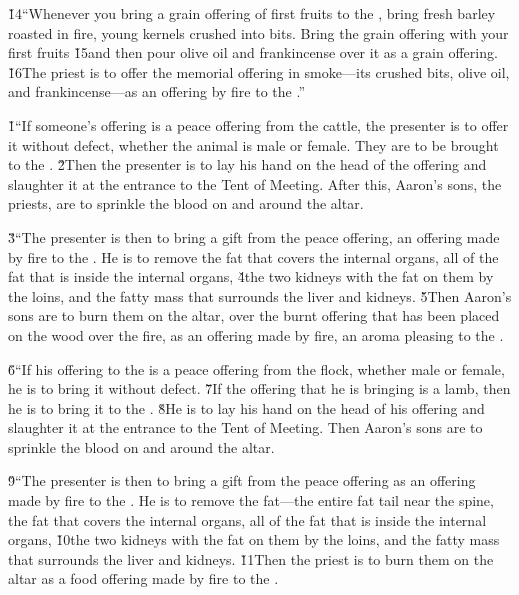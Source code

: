 \v{14}``Whenever you bring a grain offering of first fruits to the , bring fresh barley roasted in fire, young kernels crushed into bits. Bring the grain offering with your first fruits \v{15}and then pour olive oil and frankincense over it as a grain offering. \v{16}The priest is to offer the memorial offering in smoke---its crushed bits, olive oil, and frankincense---as an offering by fire to the .''

\v{1}``If someone's offering is a peace offering from the cattle, the presenter is to offer it without defect, whether the animal is male or female. They are to be brought to the . \v{2}Then the presenter is to lay his hand on the head of the offering and slaughter it at the entrance to the Tent of Meeting. After this, Aaron's sons, the priests, are to sprinkle the blood on and around the altar.

\v{3}``The presenter is then to bring a gift from the peace offering, an offering made by fire to the . He is to remove the fat that covers the internal organs, all of the fat that is inside the internal organs, \v{4}the two kidneys with the fat on them by the loins, and the fatty mass that surrounds the liver and kidneys. \v{5}Then Aaron's sons are to burn them on the altar, over the burnt offering that has been placed on the wood over the fire, as an offering made by fire, an aroma pleasing to the .

\v{6}``If his offering to the  is a peace offering from the flock, whether male or female, he is to bring it without defect. \v{7}If the offering that he is bringing is a lamb, then he is to bring it to the . \v{8}He is to lay his hand on the head of his offering and slaughter it at the entrance to the Tent of Meeting. Then Aaron's sons are to sprinkle the blood on and around the altar.

\v{9}``The presenter is then to bring a gift from the peace offering as an offering made by fire to the . He is to remove the fat---the entire fat tail near the spine, the fat that covers the internal organs, all of the fat that is inside the internal organs, \v{10}the two kidneys with the fat on them by the loins, and the fatty mass that surrounds the liver and kidneys. \v{11}Then the priest is to burn them on the altar as a food offering made by fire to the .


